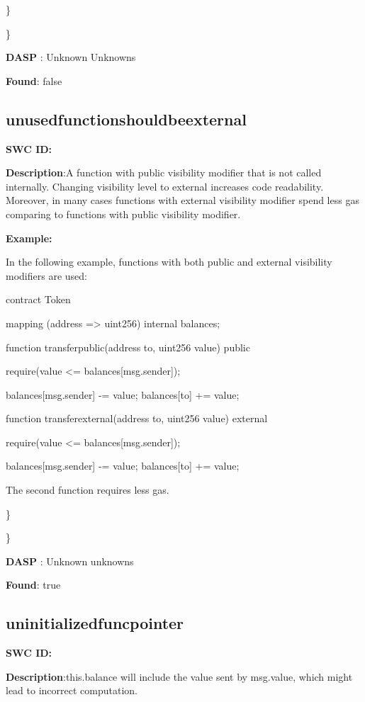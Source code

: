 \documentclass{article}
\begin{document}
\} 

\} 

\textbf{DASP} : Unknown Unknowns

\textbf{Found}: false

\subsection{unused\textunderscore function\textunderscore should\textunderscore be\textunderscore external} 
\textbf{SWC \textunderscore ID:} 

\textbf{Description}:A function with public visibility modifier that is not called internally. Changing visibility level to external increases code readability. Moreover, in many cases functions with external visibility modifier spend less gas comparing to functions with public visibility modifier.


\textbf{Example:} 

In the following example, functions with both public and external visibility modifiers are used:

contract Token {

    mapping (address => uint256) internal \textunderscore balances;

    function transfer\textunderscore public(address to, uint256 value) public {
        require(value <= \textunderscore balances[msg.sender]);

        \textunderscore balances[msg.sender] -= value;
        \textunderscore balances[to] += value;
    }

    function transfer\textunderscore external(address to, uint256 value) external {
        require(value <= \textunderscore balances[msg.sender]);

        \textunderscore balances[msg.sender] -= value;
        \textunderscore balances[to] += value;
    }
}

The second function requires less gas.

\} 

\} 

\textbf{DASP} : Unknown unknowns

\textbf{Found}: true

\subsection{uninitialized\textunderscore func\textunderscore pointer} 
\textbf{SWC \textunderscore ID:} 

\textbf{Description}:this.balance will include the value sent by msg.value, which might lead to incorrect computation.
\end{document}
